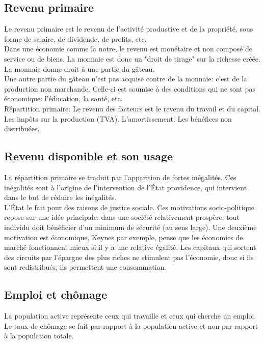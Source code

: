 \documentclass[10pt, a4paper, openany]{book}
\begin{document}
\subsection{Revenu primaire}

Le revenu primaire est le revenu de l'activité productive et de la propriété, sous forme de salaire, de dividende, de profits, etc. \\
Dans une économie comme la notre, le revenu est monétaire et non composé de service ou de biens. La monnaie est donc un "droit de tirage" sur la richesse créée. La monnaie donne droit à une partie du gâteau. \\
Une autre partie du gâteau n'est pas acquise contre de la monnaie: c'est de la production non marchande. Celle-ci est soumise à des conditions qui ne sont pas économique: l'éducation, la santé, etc. \\
Répartition primaire: Le revenu des facteurs est le revenu du travail et du capital. Les impôts sur la production (TVA). L'amortissement. Les bénéfices non distribuées. 


\subsection{Revenu disponible et son usage}
La répartition primaire se traduit par l'apparition de fortes inégalités. Ces inégalités sont à l'origine de l'intervention de l'État providence, qui intervient dans le but de réduire les inégalités. \\
L'État le fait pour des raisons de justice sociale. Ces motivations socio-politique repose sur une idée principale: dans une société relativement prospère, tout individu doit bénéficier d'un minimum de sécurité (au sens large). Une deuxième motivation est économique, Keynes par exemple, pense que les économies de marché fonctionnent mieux si il y a une relative égalité. Les capitaux qui sortent des circuits par l'épargne des plus riches ne stimulent pas l'économie, donc si ils sont redistribués, ils permettent une consommation.

\subsection{Emploi et chômage}

La population active représente ceux qui travaille et ceux qui cherche un emploi. \\
Le taux de chômage se fait par rapport à la population active et non par rapport à la population totale. 
\end{document}
